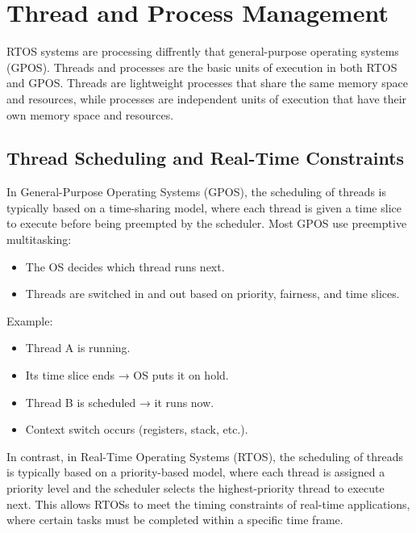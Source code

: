 \documentclass{article}
\begin{document}
\section{Thread and Process Management}
\label{sec:thread-and-process-management}
\FloatBarrier
RTOS systems are processing diffrently that general-purpose operating systems (GPOS).
Threads and processes are the basic units of execution in both RTOS and GPOS.
Threads are lightweight processes that share the same memory space and resources, while processes are independent units of execution that have their own memory space and resources. \cite{POSIX}

\subsection{Thread Scheduling and Real-Time Constraints}
\label{sec:thread-scheduling}
In General-Purpose Operating Systems (GPOS), the scheduling of threads is typically based on a time-sharing model, where each thread is given a time slice to execute before being preempted by the scheduler.
Most GPOS use preemptive multitasking:
\begin{itemize}
	\item  The OS decides which thread runs next.
	\item  Threads are switched in and out based on priority, fairness, and time slices.
\end{itemize}
Example:
\begin{itemize}
	\item  Thread A is running.
	\item  Its time slice ends → OS puts it on hold.
	\item Thread B is scheduled → it runs now.
	\item Context switch occurs (registers, stack, etc.).
\end{itemize}
In contrast, in Real-Time Operating Systems (RTOS), the scheduling of threads is typically based on a priority-based model, 
where each thread is assigned a priority level and the scheduler selects the highest-priority thread to execute next.
This allows RTOSs to meet the timing constraints of real-time applications, where certain tasks must be completed within a specific time frame. \cite{ThreadScheduling}
\end{document}
